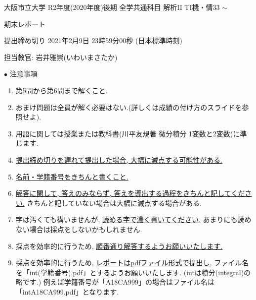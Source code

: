 \documentclass[dvipdfmx,a4paper,11pt]{article}
\theoremstyle{definition}
\begin{document}
\begin{center}
{ \large 大阪市立大学 R2年度(2020年度)後期  全学共通科目 解析II TI機・情33 $\sim$} \\
\vspace{5pt}

{\LARGE 期末レポート} \\
\vspace{5pt}

{ \Large 提出締め切り 2021年2月9日 23時59分00秒 (日本標準時刻)}
\end{center}


\begin{flushright}
 担当教官: 岩井雅崇(いわいまさたか) 
\end{flushright}

{\Large $\bullet$ 注意事項}
\begin{enumerate}
\item 第5問から第6問まで解くこと. 
\item おまけ問題は全員が解く必要はない.(詳しくは成績の付け方のスライドを参照せよ).
\item 用語に関しては授業または教科書(川平友規著 微分積分 1変数と2変数)に準じます.
\item \underline{提出締め切りを遅れて提出した場合, 大幅に減点する可能性がある.}
\item \underline{名前・学籍番号をきちんと書くこと.}
\item \underline{解答に関して, 答えのみならず, 答えを導出する過程をきちんと記してください.} きちんと記していない場合は大幅に減点する場合がある.
\item 字は汚くても構いませんが, \underline{読める字で濃く書いてください.} あまりにも読めない場合は採点をしないかもしれません.%
\item 採点を効率的に行うため, \underline{順番通り解答するようお願いいたします.}
\item 採点を効率的に行うため,  \underline{レポートはpdfファイル形式で提出し,} ファイル名を「int(学籍番号).pdf」とするようお願いいたします. 
(intは積分(integral)の略です.)
例えば学籍番号が「A18CA999」の場合はファイル名は「intA18CA999.pdf」となります.
\end{enumerate}
\end{document}
